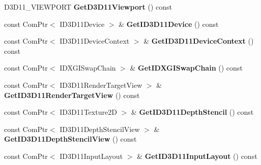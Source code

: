 \begin{DoxyCompactItemize}
\item 
\hypertarget{class_jade_1_1_graphics_1_1_d_x_device_aa3125ed2e7a78054a4a1c2b1dd940c07}{}D3\+D11\+\_\+\+V\+I\+E\+W\+P\+O\+R\+T {\bfseries Get\+D3\+D11\+Viewport} () const \label{class_jade_1_1_graphics_1_1_d_x_device_aa3125ed2e7a78054a4a1c2b1dd940c07}

\item 
\hypertarget{class_jade_1_1_graphics_1_1_d_x_device_a93034c862df624df4bd5d4d43739484f}{}const Com\+Ptr$<$ I\+D3\+D11\+Device $>$ \& {\bfseries Get\+I\+D3\+D11\+Device} () const \label{class_jade_1_1_graphics_1_1_d_x_device_a93034c862df624df4bd5d4d43739484f}

\item 
\hypertarget{class_jade_1_1_graphics_1_1_d_x_device_abc53796dbbf1c43414e6f430eeb505d6}{}const Com\+Ptr$<$ I\+D3\+D11\+Device\+Context $>$ \& {\bfseries Get\+I\+D3\+D11\+Device\+Context} () const \label{class_jade_1_1_graphics_1_1_d_x_device_abc53796dbbf1c43414e6f430eeb505d6}

\item 
\hypertarget{class_jade_1_1_graphics_1_1_d_x_device_a1b7881f30cca027fded3e615ac1beaea}{}const Com\+Ptr$<$ I\+D\+X\+G\+I\+Swap\+Chain $>$ \& {\bfseries Get\+I\+D\+X\+G\+I\+Swap\+Chain} () const \label{class_jade_1_1_graphics_1_1_d_x_device_a1b7881f30cca027fded3e615ac1beaea}

\item 
\hypertarget{class_jade_1_1_graphics_1_1_d_x_device_ad5a661a79d3ae471289df4c2307dc3e9}{}const Com\+Ptr$<$ I\+D3\+D11\+Render\+Target\+View $>$ \& {\bfseries Get\+I\+D3\+D11\+Render\+Target\+View} () const \label{class_jade_1_1_graphics_1_1_d_x_device_ad5a661a79d3ae471289df4c2307dc3e9}

\item 
\hypertarget{class_jade_1_1_graphics_1_1_d_x_device_a57e9b08a324df77e26feb5d9ad54a772}{}const Com\+Ptr$<$ I\+D3\+D11\+Texture2\+D $>$ \& {\bfseries Get\+I\+D3\+D11\+Depth\+Stencil} () const \label{class_jade_1_1_graphics_1_1_d_x_device_a57e9b08a324df77e26feb5d9ad54a772}

\item 
\hypertarget{class_jade_1_1_graphics_1_1_d_x_device_a603db8b80c1427741e1bb0682e8581ab}{}const Com\+Ptr$<$ I\+D3\+D11\+Depth\+Stencil\+View $>$ \& {\bfseries Get\+I\+D3\+D11\+Depth\+Stencil\+View} () const \label{class_jade_1_1_graphics_1_1_d_x_device_a603db8b80c1427741e1bb0682e8581ab}

\item 
\hypertarget{class_jade_1_1_graphics_1_1_d_x_device_a8bd39887abd5833f0c92fad26e2c31a8}{}const Com\+Ptr$<$ I\+D3\+D11\+Input\+Layout $>$ \& {\bfseries Get\+I\+D3\+D11\+Input\+Layout} () const \label{class_jade_1_1_graphics_1_1_d_x_device_a8bd39887abd5833f0c92fad26e2c31a8}


\end{DoxyCompactItemize}
